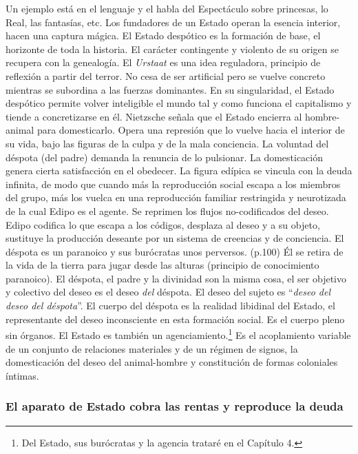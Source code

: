 \documentclass[
]{article}
\begin{document}
Un ejemplo está en el lenguaje y el habla del Espectáculo sobre
princesas, lo Real, las fantasías, etc. Los fundadores de un Estado
operan la esencia interior, hacen una captura mágica. El Estado
despótico es la formación de base, el horizonte de toda la historia. El
carácter contingente y violento de su origen se recupera con la
genealogía. El \emph{Urstaat} es una idea reguladora, principio de
reflexión a partir del terror. No cesa de ser artificial pero se vuelve
concreto mientras se subordina a las fuerzas dominantes. En su
singularidad, el Estado despótico permite volver inteligible el mundo
tal y como funciona el capitalismo y tiende a concretizarse en él.
Nietzsche señala que el Estado encierra al hombre-animal para
domesticarlo. Opera una represión que lo vuelve hacia el interior de su
vida, bajo las figuras de la culpa y de la mala conciencia. La voluntad
del déspota (del padre) demanda la renuncia de lo pulsionar. La
domesticación genera cierta satisfacción en el obedecer. La figura
edípica se vincula con la deuda infinita, de modo que cuando más la
reproducción social escapa a los miembros del grupo, más los vuelca en
una reproducción familiar restringida y neurotizada de la cual Edipo es
el agente. Se reprimen los flujos no-codificados del deseo. Edipo
codifica lo que escapa a los códigos, desplaza al deseo y a su objeto,
sustituye la producción deseante por un sistema de creencias y de
conciencia. El déspota es un paranoico y sus burócratas unos perversos.
(p.100) Él se retira de la vida de la tierra para jugar desde las
alturas (principio de conocimiento paranoico). El déspota, el padre y la
divinidad son la misma cosa, el ser objetivo y colectivo del deseo es el
deseo \emph{del} déspota. El deseo del sujeto es ``\emph{deseo del deseo
del déspota}''. El cuerpo del déspota es la realidad libidinal del
Estado, el representante del deseo inconsciente en esta formación
social. Es el cuerpo pleno sin órganos. El Estado es también un
agenciamiento.\footnote{Del Estado, sus burócratas y la agencia trataré
  en el Capítulo 4.} Es el acoplamiento variable de un conjunto de
relaciones materiales y de un régimen de signos, la domesticación del
deseo del animal-hombre y constitución de formas coloniales íntimas.

\hypertarget{el-aparato-de-estado-cobra-las-rentas-y-reproduce-la-deuda}{%
\subsubsection{El aparato de Estado cobra las rentas y reproduce la
deuda}\label{el-aparato-de-estado-cobra-las-rentas-y-reproduce-la-deuda}}
\end{document}
